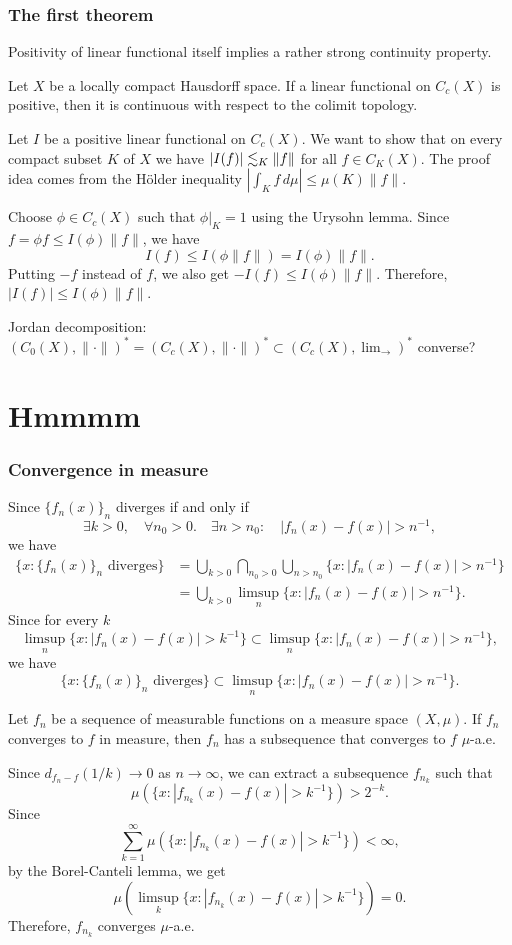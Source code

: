 \documentclass{../crs}
\begin{document}
\subsection{The first theorem}
Positivity of linear functional itself implies a rather strong continuity property.
\begin{thm}
Let $X$ be a locally compact Hausdorff space.
If a linear functional on $C_c(X)$ is positive, then it is continuous with respect to the colimit topology.
\end{thm}
\begin{pf}
Let $I$ be a positive linear functional on $C_c(X)$.
We want to show that on every compact subset $K$ of $X$ we have $|I(f)|\lesssim_K\|f\|$ for all $f\in C_K(X)$.
The proof idea comes from the H\"older inequality $|\int_K f\,d\mu|\le\mu(K)\|f\|$.

Choose $\phi\in C_c(X)$ such that $\phi|_K=1$ using the Urysohn lemma.
Since $f=\phi f\le I(\phi)\|f\|$, we have
\[I(f)\le I(\phi\|f\|)=I(\phi)\|f\|.\]
Putting $-f$ instead of $f$, we also get $-I(f)\le I(\phi)\|f\|$.
Therefore, $|I(f)|\le I(\phi)\|f\|$.
\end{pf}





Jordan decomposition: $(C_0(X),\|\cdot\|)^*=(C_c(X),\|\cdot\|)^*\subset(C_c(X),\lim_{\to})^*$
converse?




\chapter{Hmmmm}

\subsection{Convergence in measure}
Since $\{f_n(x)\}_n$ diverges if and only if
\[\exists k>0,\quad\forall n_0>0.\quad\exists n>n_0:\quad |f_n(x)-f(x)|>n^{-1},\]
we have
\begin{align*}
\{x:\{f_n(x)\}_n\text{ diverges}\}&=\bigcup_{k>0}\bigcap_{n_0>0}\bigcup_{n>n_0}\{x:|f_n(x)-f(x)|>n^{-1}\}\\
&=\bigcup_{k>0}\limsup_n\{x:|f_n(x)-f(x)|>n^{-1}\}.
\end{align*}
Since for every $k$
\[\limsup_n\{x:|f_n(x)-f(x)|>k^{-1}\}\subset\limsup_n\{x:|f_n(x)-f(x)|>n^{-1}\},\]
we have
\[\{x:\{f_n(x)\}_n\text{ diverges}\}\subset\limsup_n\{x:|f_n(x)-f(x)|>n^{-1}\}.\]




\begin{thm}
Let $f_n$ be a sequence of measurable functions on a measure space $(X,\mu)$.
If $f_n$ converges to $f$ in measure, then $f_n$ has a subsequence that converges to $f$ $\mu$-a.e.
\end{thm}
\begin{pf}
Since $d_{f_n-f}(1/k)\to0$ as $n\to\infty$, we can extract a subsequence $f_{n_k}$ such that
\[\mu(\{x:|f_{n_k}(x)-f(x)|>k^{-1}\})>2^{-k}.\]
Since
\[\sum_{k=1}^\infty\mu(\{x:|f_{n_k}(x)-f(x)|>k^{-1}\})<\infty,\]
by the Borel-Canteli lemma, we get
\[\mu(\limsup_k\{x:|f_{n_k}(x)-f(x)|>k^{-1}\})=0.\]
Therefore, $f_{n_k}$ converges $\mu$-a.e.
\end{pf}
\end{document}
